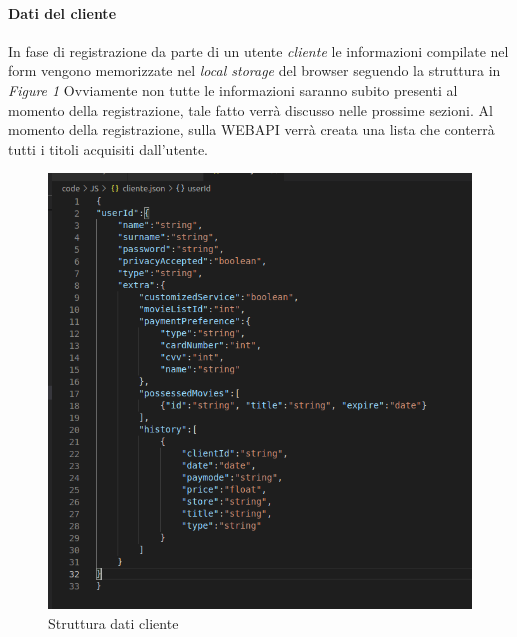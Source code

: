 \documentclass{article}
\begin{document}
    \paragraph{Dati del cliente}
    In fase di registrazione da parte di un utente \emph{cliente} le informazioni compilate nel form vengono memorizzate nel \emph{local storage} del browser seguendo la struttura in \emph{Figure 1}
    Ovviamente non tutte le informazioni saranno subito presenti al momento della registrazione, tale fatto verrà discusso nelle prossime sezioni.
    Al momento della registrazione, sulla WEBAPI verrà creata una lista che conterrà tutti i titoli acquisiti dall'utente.
    \begin{figure}
        \includegraphics[width=\textwidth,height=\textheight,keepaspectratio] {img/cliente.png} 
        \caption{Struttura dati cliente}
    \end{figure}
\end{document}
